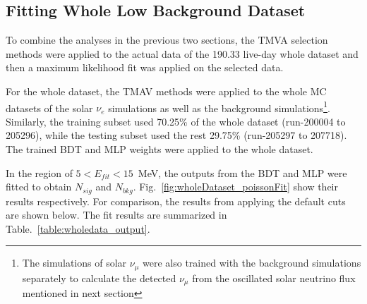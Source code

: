 \subsection{Fitting Whole Low Background Dataset}\label{sect:fitTheWhole}
To combine the analyses in the previous two sections, the TMVA selection methods were applied to the actual data of the 190.33 live-day whole dataset and then a maximum likelihood fit was applied on the selected data. 

For the whole dataset, the TMAV methods were applied to the whole MC datasets of the solar $\nu_e$ simulations as well as the background simulations\footnote{The simulations of solar $\nu_{\mu}$ were also trained with the background simulations separately to calculate the detected $\nu_\mu$ from the oscillated solar neutrino flux mentioned in next section}. Similarly, the training subset used 70.25\% of the whole dataset (run-200004 to 205296), while the testing subset used the rest 29.75\% (run-205297 to 207718). The trained BDT and MLP weights were applied to the whole dataset.

In the region of $5<E_{fit}<15$~MeV, the outputs from the BDT and MLP were fitted to obtain $N_{sig}$ and $N_{bkg}$. Fig.~\ref{fig:wholeDataset_poissonFit} show their results respectively. For comparison, the results from applying the default cuts are shown below. The fit results are summarized in Table.~\ref{table:wholedata_output}. 

